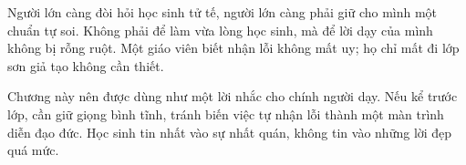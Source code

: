 \begin{tongketchuong}
Người lớn càng đòi hỏi học sinh tử tế, người lớn càng phải giữ cho mình một chuẩn tự soi. Không phải để làm vừa lòng học sinh, mà để lời dạy của mình không bị rỗng ruột. Một giáo viên biết nhận lỗi không mất uy; họ chỉ mất đi lớp sơn giả tạo không cần thiết.
\end{tongketchuong}

\begin{goigiaovien}
Chương này nên được dùng như một lời nhắc cho chính người dạy. Nếu kể trước lớp, cần giữ giọng bình tĩnh, tránh biến việc tự nhận lỗi thành một màn trình diễn đạo đức. Học sinh tin nhất vào sự nhất quán, không tin vào những lời đẹp quá mức.
\end{goigiaovien}

\ngancach